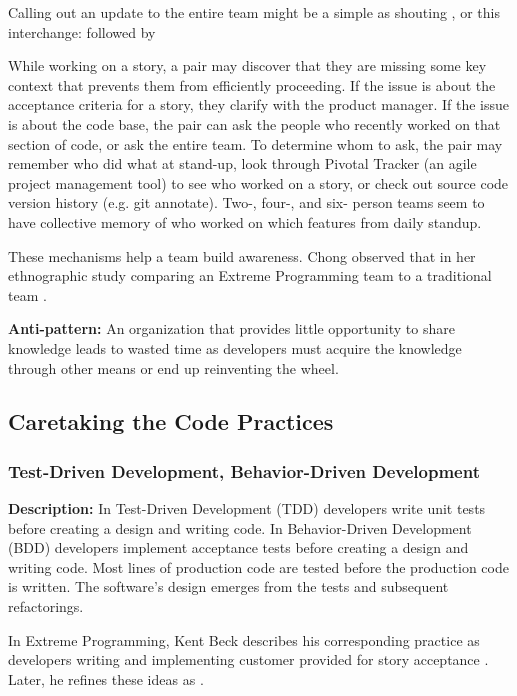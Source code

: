 Calling out an update to the entire team might be a simple as shouting , or this interchange:  followed by 

While working on a story, a pair may discover that they are missing some key context that prevents them from efficiently proceeding. If the issue is about the acceptance criteria for a story, they clarify with the product manager. If the issue is about the code base, the pair can ask the people who recently worked on that section of code, or ask the entire team. To determine whom to ask, the pair may remember who did what at stand-up, look through Pivotal Tracker (an agile project management tool) to see who worked on a story, or check out source code version history (e.g. git annotate). Two-, four-, and six- person teams seem to have collective memory of who worked on which features from daily standup. 

These mechanisms help a team build awareness. Chong observed that  in her ethnographic study comparing an Extreme Programming team to a traditional team \cite{ChongNominum}.
 
\textbf{Anti-pattern:} An organization that provides little opportunity to share knowledge leads to wasted time as developers must acquire the knowledge through other means or end up reinventing the wheel.
\subsection{Caretaking the Code Practices}
\subsubsection{Test-Driven Development, Behavior-Driven Development}
\textbf{Description:} In Test-Driven Development (TDD) developers write unit tests before creating a design and writing code. In Behavior-Driven Development (BDD) developers implement acceptance tests before creating a design and writing code. Most lines of production code are tested before the production code is written. The software’s design emerges from the tests and subsequent refactorings.

In Extreme Programming, Kent Beck describes his corresponding  practice as developers writing  and implementing customer provided  for story acceptance \cite{BeckExtremeProgramming1999}. Later, he refines these ideas as  \cite{BeckExtremeProgramming2004}. 

